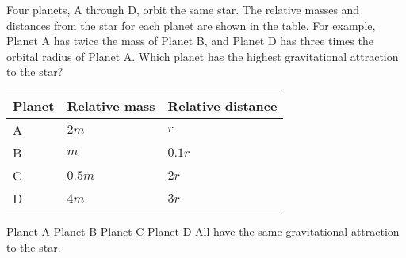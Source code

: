 \documentclass{../../oss-apphys-exam}
\begin{document}
\begin{multicols*}{2}
\begin{questions}
    \question Four planets, A through D, orbit the same star. The relative
    masses and distances from the star for each planet are shown in the table.
    For example, Planet A has twice the mass of Planet B, and Planet D has
    three times the orbital radius of Planet A. Which planet has the highest
    gravitational attraction to the star?
    \begin{center}
      \vspace{-.1in}
      \begin{tabular}{lll}
        \hline
        \textbf{Planet} & \textbf{Relative mass} & \textbf{Relative distance}\\
        \hline
        A\hspace{.4in}& $2m$     & $r$    \\ \hline
        B & $m$                  & $0.1r$\hspace{.25in} \\ \hline
        C & $0.5m$\hspace{.25in} & $2r$   \\ \hline
        D & $4m$                 & $3r$   \\ \hline
      \end{tabular}
    \end{center}
    \begin{choices}
      \choice Planet A
      \choice Planet B
      \choice Planet C
      \choice Planet D
      \choice All have the same gravitational attraction to the star.
    \end{choices}
    \vspace{.7in}
    
%  
    

\end{questions}
\end{multicols*}
\end{document}
